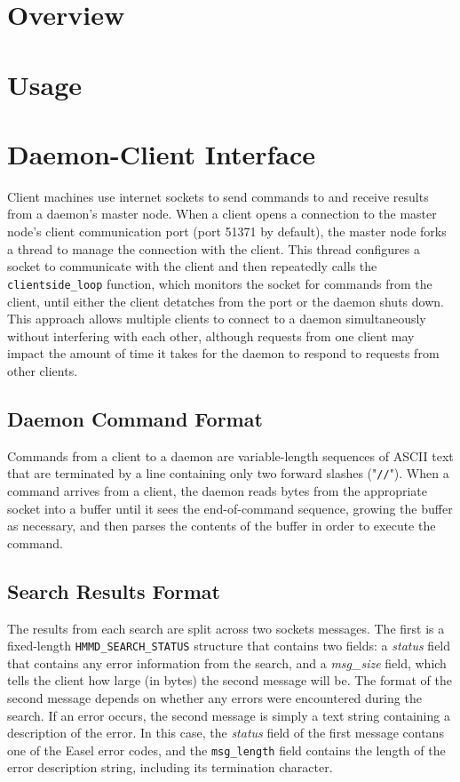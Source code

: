 \documentclass[notoc]{tufte-book}    %
\begin{document}
\chapter{Overview}


\chapter{Usage}

\chapter{Daemon-Client Interface}
Client machines use internet sockets to send commands to and receive results from a daemon's master node.  When a client opens a connection to the master node's client communication port (port 51371 by default), the master node forks a thread to manage the connection with the client.  This thread configures a socket to communicate with the client and then repeatedly calls the {\tt clientside\_loop} function, which monitors the socket for commands from the client, until either the client detatches from the port or the daemon shuts down.  This approach allows multiple clients to connect to a daemon simultaneously without interfering with each other, although requests from one client may impact the amount of time it takes for the daemon to respond to requests from other clients.

\section{Daemon Command Format}
Commands from a client to a daemon are variable-length sequences of ASCII text that are terminated by a line containing only two forward slashes ("{\tt //}").  When a command arrives from a client, the daemon reads bytes from the appropriate socket into a buffer until it sees the end-of-command sequence, growing the buffer as necessary, and then parses the contents of the buffer in order to execute the command.   

\section{Search Results Format}
The results from each search are split across two sockets messages.  The first is a fixed-length {\tt HMMD\_SEARCH\_STATUS} structure that contains two fields: a {\em status} field that contains any error information from the search, and a {\em msg\_size} field, which tells the client how large (in bytes) the second message will be.  The format of the second message depends on whether any errors were encountered during the search.  If an error occurs, the second message is simply a text string containing a description of the error.  In this case, the {\em status} field of the first message contans one of the Easel error codes, and the {\tt msg\_length} field contains the length of the error description string, including its termination character.
\end{document}

